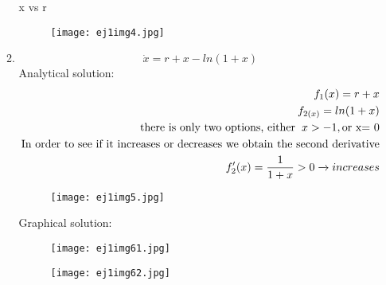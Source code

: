 \documentclass[a4paper,10pt]{article}
\begin{document}
\begin{enumerate}
\begin{enumerate}
\begin{figure}[h]
                    \label{fig:mesh1}
                \end{figure}
                x vs r
                \begin{figure}[h]
                    \centering
                    \texttt{[image: ej1img4.jpg]}
                    
                    \label{fig:mesh1}
                \end{figure}
            
            
            \item 
                \begin{equation}
                    \dot{x}= r + x - ln(1+x)
                \end{equation}
                Analytical solution:
                \begin{equation}
                    \begin{aligned}
                        f_{1}(x)= r+x\\
                        f_{2(x)}= ln( 1+x)\\
                        \text{there is only two options, either}\hspace{0.2cm}x> -1, \text{or x= 0}\\
                        \text{In order to see if it increases or decreases we obtain the second derivative}\\
                        f'_{2}(x)=\frac{1}{1+x}> 0 \xrightarrow{} increases
                    \end{aligned}
                \end{equation}
                \begin{figure}[h]
                    \centering
                    \texttt{[image: ej1img5.jpg]}
                    
                    \label{fig:mesh1}
                \end{figure}
                \newpage
                Graphical solution:
                
                \begin{figure}[h]
                    \centering
                    \texttt{[image: ej1img61.jpg]}
                    
                    \label{fig:mesh1}
                \end{figure} 
                \newpage
                \begin{figure}[h]
                    \centering
                    \texttt{[image: ej1img62.jpg]}
                    

\end{figure}
\end{enumerate}
\end{enumerate}
\end{document}
